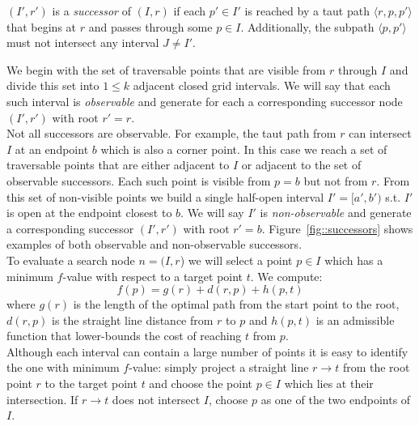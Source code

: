 \begin{defi}
$(I', r')$ is a \emph{successor} of
$(I, r)$ if each $p' \in I'$ is reached
by a taut path $\langle r, p,  p' \rangle$ that begins
at $r$ and passes through some $p \in I$.  Additionally, 
the subpath $\langle p, p' \rangle$ must not intersect any 
interval $J \neq I'$.
\end{defi}
We begin with the set of traversable points that are 
visible from $r$ through $I$ and divide this set into $1 \leq k$
adjacent closed grid intervals.
We will say that each such interval is \emph{observable} and 
generate for each a corresponding successor node 
$(I', r')$ with root $r' = r$.
\\
Not all successors are observable.
For example, the taut path from $r$ can intersect 
$I$ at an endpoint $b$ which is also a corner point.
In this case we reach a set of traversable points that 
are either adjacent to $I$ or adjacent to the set of 
observable successors.
Each such point is visible from $p = b$ but not 
from $r$.  From this set of non-visible points we build a 
single half-open interval $I' = [a', b')$ s.t. $I'$ is open at the 
endpoint closest to $b$.
We will say $I'$ is \emph{non-observable} and generate a 
corresponding successor $(I', r')$ with root $r' = b$.  
Figure~\ref{fig::successors} shows examples of both
observable and non-observable successors.
%
\\
To evaluate a search node $n = (I, r$) we will select a point $p \in I$ 
which has a minimum $f$-value with respect to a target point $t$.
We compute: 
\begin{equation}
\label{eq::f}
f(p) = g(r) + d(r, p) + h(p, t)
\end{equation}
where $g(r)$ is the length of the optimal path from the start point to 
the root, $d(r, p)$ is the straight line distance from $r$ to $p$
and $h(p, t)$ is an admissible function that lower-bounds the cost of
reaching $t$ from $p$.
\\
Although each interval can contain a large number of points it is easy to
identify the one with minimum $f$-value: simply project a straight line $r
\rightarrow t$ from the root point $r$ to the target point $t$ and choose the
point $p \in I$ which lies at their intersection.  If $r \rightarrow t$ does not
intersect $I$, choose $p$ as one of the two endpoints of $I$.

